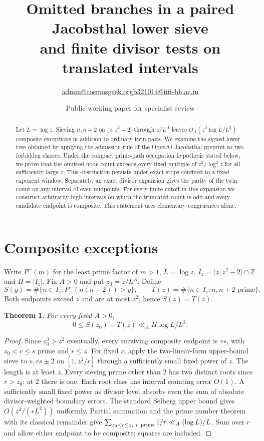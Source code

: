 \documentclass[11pt]{article}
\title{Omitted branches in a paired Jacobsthal lower sieve\\
and finite divisor tests on translated intervals}
\author{\small \href{mailto:admin@cosmosgeek.org}{admin@cosmosgeek.org}\qquad \href{mailto:b321014@iiit-bh.ac.in}{b321014@iiit-bh.ac.in}}
\date{Public working paper for specialist review}
\newtheorem{theorem}{Theorem}
\begin{document}
\maketitle
\begin{abstract}
Let $L=\log z$. Sieving $n,n+2$ on $(z,z^2-2]$ through $z/L^A$ leaves $O_A(z^2\log L/L^3)$ composite exceptions in addition to ordinary twin pairs. We examine the signed lower tree obtained by applying the admission rule of the OpenAI Jacobsthal preprint to two forbidden classes. Under the compact prime-path occupation hypothesis stated below, we prove that the omitted-node count exceeds every fixed multiple of $z^2/\log^2 z$ for all sufficiently large $z$. This obstruction persists under exact stops confined to a fixed exponent window.
Separately, an exact divisor expansion gives the parity of the twin count
on any interval of even midpoints. For every finite cutoff in this
expansion we construct arbitrarily high intervals on which the truncated
count is odd and every candidate endpoint is composite. This statement
uses elementary congruences alone.
\end{abstract}
\section{Composite exceptions}
Write $P^-(m)$ for the least prime factor of $m>1$, $L=\log z$, $I_z=(z,z^2-2]\cap\mathbb Z$ and $H=|I_z|$. Fix $A>0$ and put $z_0=z/L^A$. Define
\[
 S(y)=\#\{n\in I_z:P^-(n(n+2))>y\},\qquad T(z)=\#\{n\in I_z:n,n+2\text{ prime}\}.
\]
Both endpoints exceed $z$ and are at most $z^2$, hence $S(z)=T(z)$.
\begin{theorem}For every fixed $A>0$,
\[
 0\le S(z_0)-T(z)\ll_A H\log L/L^3.
\]
\end{theorem}
\begin{proof}
Since $z_0^3>z^2$ eventually, every surviving composite endpoint is $rs$, with $z_0<r\le s$ prime and $r\le z$. For fixed $r$, apply the two-linear-form upper-bound sieve to $s,rs\pm2$ on $[1,z^2/r]$ through a sufficiently small fixed power of $z$. The length is at least $z$. Every sieving prime other than $2$ has two distinct roots since $r>z_0$; at $2$ there is one. Each root class has interval counting error $O(1)$. A sufficiently small fixed power as divisor level absorbs even the sum of absolute divisor-weighted boundary errors. The standard Selberg upper bound gives $O(z^2/(rL^2))$ uniformly. Partial summation and the prime number theorem with its classical remainder give $\sum_{z_0<r\le z,\ r\ \rm prime}1/r\ll_A(\log L)/L$. Sum over $r$ and allow either endpoint to be composite; squares are included.
\end{proof}
\end{document}
